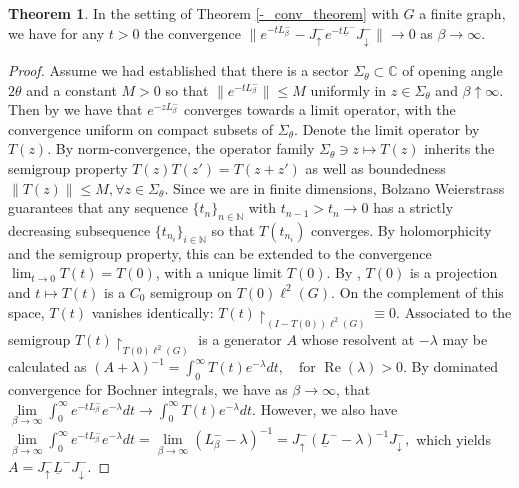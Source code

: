 \documentclass[reqno,12pt,letterpaper]{amsart}
\numberwithin{equation}{section}
\newcommand{\Lin}{L^{-}}
\renewcommand{\Re}{\operatorname{Re}}
\newcommand{\1}{\mathds{1}}
\theoremstyle{definition}
\newtheorem{Thm}[Th]{Theorem}
\begin{document}
\begin{Thm}\label{directed_semi_group_convergence}
In the setting of Theorem \ref{-_conv_theorem} with $G$ a finite graph, we have for any $t  > 0$ the convergence 
 $\|e^{-t\Lin_\beta} - J^-_\uparrow  e^{-t\underline{L}^-} J^-_\downarrow\| \rightarrow 0$ as $\beta \rightarrow \infty$.
\end{Thm}
\begin{proof}
Assume we had established that there is a sector $\Sigma_\theta \subset \mathds{C}$ of opening angle $2\theta$ and a constant $M>0$ so that $\|e^{-t\Lin_\beta}\| \leq M$ uniformly in $z \in \Sigma_\theta$ and  $\beta \uparrow \infty$. Then by \cite[Theorem 1.6]{arendt2001approximation} we have that $e^{-z\Lin_\beta}$ converges  towards a  limit operator, with the convergence uniform on compact subsets of 
$\Sigma_\theta $. Denote the limit operator by $T(z)$. By norm-convergence, the operator family $\Sigma_\theta \ni z \mapsto T(z)$ inherits the semigroup property $T(z)T(z') = T(z + z')$ as well as boundedness $\|T(z)\| \leq M, \forall z \in \Sigma_\theta$.
Since we are in finite dimensions, Bolzano Weierstrass guarantees that any sequence $\{t_n\}_{n \in \mathds{N}}$ with $t_{n-1} > t_{n} \rightarrow 0 $ has a strictly decreasing subsequence $\{t_{n_i}\}_{i \in \mathds{N}}$ so that $T(t_{n_i})$ converges. By holomorphicity and the semigroup property, this can be extended to the convergence $\lim_{t \rightarrow 0} T(t) = T(0)$, with a unique limit $T(0)$. By \cite[Section 2]{arendt2001approximation}, $T(0)$ is a projection and $t \mapsto T(t)$ is a $C_0$ semigroup on $T(0)\ell^2(G)$. On the complement of this space,  $T(t)$ vanishes identically: $T(t){\restriction_{(I - T(0))\ell^2(G)}} \equiv 0$. Associated to the semigroup $T(t){\restriction_{T(0)\ell^2(G)}} $ is a generator $A$ whose resolvent at $-\lambda$  may be calculated as
$
	(A + \lambda)^{-1} = \int_0^\infty T(t)e^{-\lambda} dt, \quad \text{for $\Re(\lambda) > 0$}.
$
By dominated convergence for Bochner integrals, we have as $\beta \rightarrow \infty$, that
$
\lim\limits_{\beta \rightarrow \infty}\int_0^\infty e^{-t\Lin_\beta}e^{-\lambda} dt \rightarrow	\int_0^\infty T(t)e^{-\lambda} dt.
$
However, we also have
$
	\lim\limits_{\beta \rightarrow \infty}\int_0^\infty e^{-t\Lin_\beta}e^{-\lambda} dt 
	 = 	\lim\limits_{\beta \rightarrow \infty} (\Lin_\beta - \lambda)^{-1}
	=J^-_\uparrow  (\underline{L}^- - \lambda)^{-1} J^-_\downarrow ,
$
which yields $A  = J^-_\uparrow \underline{L}^- J^-_\downarrow$.
\medskip









\end{proof}
\end{document}
